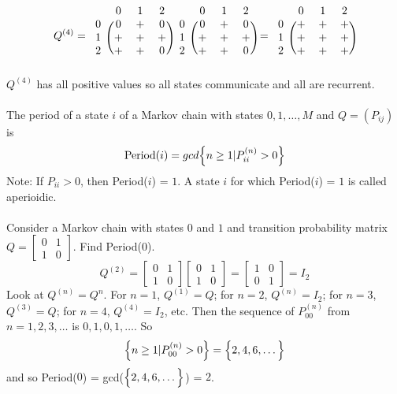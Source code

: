 \documentclass[12pt]{article}
\begin{document}
$$ Q^{(4)} = \begin{blockarray}{cccc}
&0&1&2 \\ \begin{block}{c(ccc)}
0 & 0 & + & 0 \\
1 & + & + & + \\ 
2 & + & + & 0  \\ \end{block} \end{blockarray} \begin{blockarray}{cccc}
&0&1&2 \\ \begin{block}{c(ccc)}
0 & 0 & + & 0 \\
1 & + & + & + \\ 
2 & + & + & 0  \\ \end{block} \end{blockarray} = \begin{blockarray}{cccc}
&0&1&2 \\ \begin{block}{c(ccc)}
0 & + & + & + \\
1 & + & + & + \\ 
2 & + & + & +  \\ \end{block} \end{blockarray} $$ 
$Q^{(4)}$ has all positive values so all states communicate and all are recurrent. \\~\\
The period of a state $i$ of a Markov chain with states $0,1,\dots,M$ and $Q = (P_{ij})$ is $$ \text{Period}(i) = gcd\Big\{ n \geq 1 | P_{ii}^{(n)} > 0 \Big\} $$ 
Note: If $P_{ii} > 0$, then Period($i$) = $1$. A state $i$ for which Period($i$) = $1$ is called aperioidic. \\~\\
Consider a Markov chain with states $0$ and $1$ and transition probability matrix $Q = \begin{bmatrix} 0 & 1 \\ 1 & 0 \end{bmatrix}$. Find Period($0$).
$$ Q^{(2)} = \begin{bmatrix} 0 & 1 \\ 1 & 0 \end{bmatrix} \begin{bmatrix} 0 & 1 \\ 1 & 0 \end{bmatrix} = \begin{bmatrix} 1 & 0 \\ 0 & 1 \end{bmatrix} = I_2 $$ Look at $Q^{(n)} = Q^n$. For $n=1$, $Q^{(1)} = Q$; for $n=2$, $Q^{(n)} = I_2$; for $n=3$, $Q^{(3)} = Q$; for $n=4$, $Q^{(4)} = I_2$, etc. Then the sequence of $P_{00}^{(n)}$ from $n = 1,2,3,\dots$ is $0,1,0,1,\dots$. So $$ \Big\{ n \geq 1 | P_{00}^{(n)} > 0 \Big\} = \Big\{ 2,4,6,\dots \Big\}$$ and so Period($0$) = gcd($\Big\{ 2,4,6,\dots \Big\}$) = $2$. \\
\end{document}
